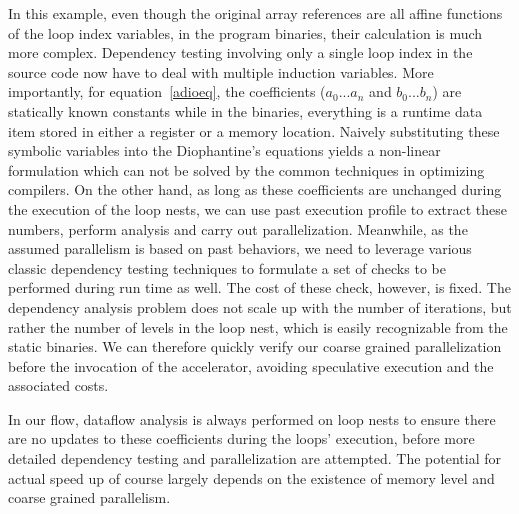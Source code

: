 In this example, even though the original array references are all affine functions of the loop index variables, in the program binaries, their calculation is much more complex. 
Dependency testing involving only a single loop index in the source code now have to deal with multiple induction variables. More importantly, for equation~\ref{adioeq}, the coefficients ($a_0...a_n$ and $b_0 ... b_n$) are statically known constants while
in the binaries, everything is a runtime data item stored in either a register or a memory location. Naively 
substituting these symbolic variables into the Diophantine's equations yields
a non-linear formulation which can not be solved by the common techniques
in optimizing compilers. On the other hand, %
as long as these coefficients are unchanged during the execution of the loop nests, we can use past execution profile to extract these numbers, perform analysis and carry out parallelization. Meanwhile, as the assumed parallelism is based on past behaviors, we need to leverage various classic dependency testing techniques to formulate a set of checks to be performed during run time as well. The cost of these check, however, is fixed. The dependency
analysis problem does not scale up with the number of iterations, but rather the number of levels in the loop nest, which is easily recognizable from the static binaries. We can therefore quickly verify our coarse grained parallelization before the invocation of the accelerator, 
avoiding speculative execution and the associated costs. 

In our flow, dataflow analysis is always performed on loop nests to ensure there are no updates to these coefficients during the loops' execution, before more detailed dependency testing and parallelization are attempted. The  potential for actual speed up of course largely depends on the existence of memory level and coarse grained parallelism.












